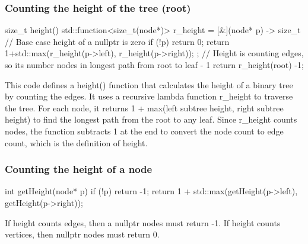 \documentclass{report}
\begin{document}
    \pagebreak 
    \subsubsection{Counting the height of the tree (root)}
    \bigbreak \noindent 
    \begin{cppcode}
        size_t height() {
            std::function<size_t(node*)> r_height = [&](node* p) -> size_t {
                // Base case height of a nullptr is zero
                if (!p) return 0;
                return 1+std::max(r_height(p->left), r_height(p->right));
            };
            // Height is counting edges, so its number nodes in longest path from root to leaf - 1
            return r_height(root) -1; 
        }
    \end{cppcode}
    \bigbreak \noindent 
    This code defines a height() function that calculates the height of a binary tree by counting the edges. It uses a recursive lambda function r\_height to traverse the tree. For each node, it returns 1 + max(left subtree height, right subtree height) to find the longest path from the root to any leaf. Since r\_height counts nodes, the function subtracts 1 at the end to convert the node count to edge count, which is the definition of height.

    \bigbreak \noindent 
    \subsubsection{Counting the height of a node}
    \bigbreak \noindent 
    \begin{cppcode}
    int getHeight(node* p) {
        if (!p) return -1;
        return 1 + std::max(getHeight(p->left), getHeight(p->right));
    }
    \end{cppcode}
    \bigbreak \noindent 
    If height counts edges, then a nullptr nodes must return -1. If height counts vertices, then nullptr nodes must return 0.


    \pagebreak 
\end{document}

